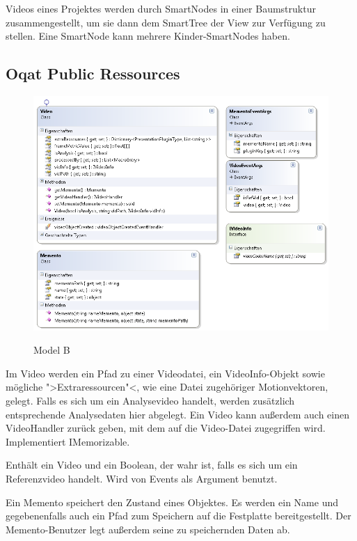 Videos eines Projektes werden durch SmartNodes in einer Baumstruktur zusammengestellt, um sie dann dem SmartTree der View zur Verfügung zu stellen. Eine SmartNode kann mehrere Kinder-SmartNodes haben.

\pagebreak
\subsection{Oqat Public Ressources}
\begin{figure}[H]
\noindent\includegraphics[width=\linewidth]{bilder/Klassendiagramm/publicModel.png}
\label{Private Model B}
\caption{Model B}
\end{figure}

Im Video werden ein Pfad zu einer Videodatei, ein VideoInfo-Objekt sowie mögliche ">Extraressourcen"<, wie eine Datei zugehöriger Motionvektoren, gelegt. Falls es sich um ein Analysevideo handelt, werden zusätzlich entsprechende Analysedaten hier abgelegt. Ein Video kann außerdem auch einen VideoHandler zurück geben, mit dem auf die Video-Datei zugegriffen wird. Implementiert IMemorizable.


Enthält ein Video und ein Boolean, der wahr ist, falls es sich um ein Referenzvideo handelt. Wird von Events als Argument benutzt.


Ein Memento speichert den Zustand eines Objektes. Es werden ein Name und gegebenenfalls auch ein Pfad zum Speichern auf die Festplatte bereitgestellt. Der Memento-Benutzer legt außerdem seine zu speichernden Daten ab.


